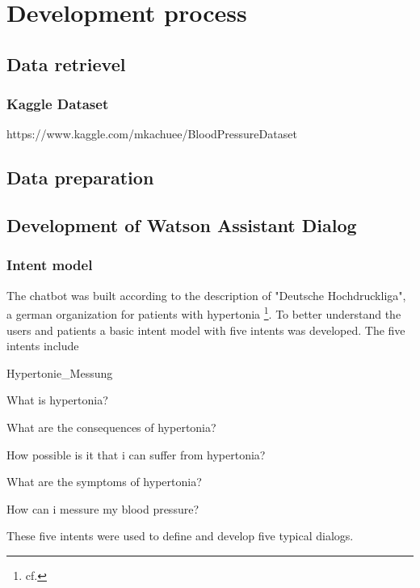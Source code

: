 \chapter{Development process}\label{dev_process}

\section{Data retrievel}

\subsection{Kaggle Dataset}
https://www.kaggle.com/mkachuee/BloodPressureDataset

\section{Data preparation}

\section{Development of Watson Assistant Dialog}

\subsection{Intent model}

The chatbot was built according to the description of "Deutsche Hochdruckliga", a german organization for patients with hypertonia \footnote{cf.\autocite{hochdruckliga}}.
To better understand the users and patients a basic intent model with five intents was developed. 
The five intents include 

\begin{labeling}{Hypertonie_Messung}
\item [Hypertonie_Definition] What is hypertonia?
\item [Hypertonie_Schaeden] What are the consequences of hypertonia?
\item [Hypertonie_Risiko] How possible is it that i can suffer from hypertonia?
\item [Hypertonie_Symptome] What are the symptoms of hypertonia?
\item [Hypertonie_Messung] How can i messure my blood pressure?
\end{labeling}

These five intents were used to define and develop five typical dialogs. 


